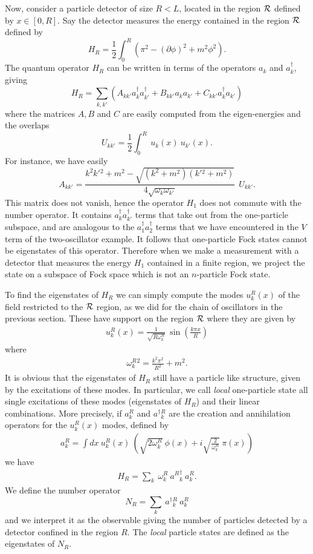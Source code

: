 \documentclass[10pt, nofootinbib]{revtex4}
\newcommand{\be}{\begin{equation}}
\newcommand{\ee}{\end{equation}}
\newcommand{\bea}{\begin{eqnarray}}
\newcommand{\eea}{\end{eqnarray}}
\begin{document}
Now, consider a particle detector of size $R<L$, located in the
region $\cal R$ defined by $x\in [0,R]$.  Say the detector measures
the energy contained in the region $\cal R$ defined by
%
\be 
H_{R} = \frac{1}{2} \int_{0}^{R}
\left(\pi^2-(\partial\phi)^2+m^2\phi^2 \right).  
\ee
%
The quantum operator $H_{R}$ can be written in terms of the 
operators $a_{k}$ and $a^\dagger_{k}$, giving 
%
\be 
H_{R} = \sum_{k,k'} (A_{kk'} a^\dagger_{k}a^\dagger_{k'}+
B_{kk'} a_{k}a_{k'}+
C_{kk'} a^\dagger_{k}a_{k'})
\ee
%
where the matrices $A, B$ and $C$ are easily computed from the 
eigen-energies and the overlaps
%
\be 
U_{kk'} =  \frac{1}{2} \int_{0}^{R} \ u_{k}(x)   \ u_{k'}(x).   
\ee
%
For instance, we have easily
%
\be 
A_{kk'} = \frac{k^2k'{}^2+m^2-\sqrt{(k^2+m^2)(k'{}^2+m^2)}}
{4\sqrt{\omega_{k}\omega_{k'}}}\ \  U_{kk'} .   
\ee
%
This matrix does not vanish, hence the operator $H_{1}$ does not
commute with the number operator.  It contains $
a^\dagger_{k}a^\dagger_{k'}$ terms that take out from the one-particle
subspace, and are analogous to the $ a^\dagger_{1}a^\dagger_{2}$
terms that we have encountered in the $V$ term of the two-oscillator
example.  It follows that one-particle Fock states cannot be
eigenstates of this operator.  Therefore when we make a measurement
with a detector that measures the energy $H_{1}$ contained in a finite
region, we project the state on a subspace of Fock space which is not
an $n$-particle Fock state.  

To find the eigenstates of $H_{R}$ we can simply compute the modes
$u^{R}_{k}(x)$ of the field restricted to the $\cal R$ region, as we
did for the chain of oscillators in the previous section.  These have
support on the region $\cal R$ where they are given by
%
\bea 
u^{R}_{k}(x)= \frac{1}{\sqrt{R \omega^{R}_{k}}} \  
\sin \left( \frac{k \pi x}{R}
\right)
\eea
%
where
%
\bea \omega^{R}_{k}{}^2 = \frac{k^2 \pi^2}{R^2} + m^2.  \eea
%
It is obvious that the eigenstates of $H_{R}$ still
have a particle like structure, given by the excitations of these
modes.  In particular, we call \emph{local} one-particle state all
single excitations of these modes (eigenstates of $H_{R}$) and their
linear combinations.  More precisely, if $a^{R}_{k}$ and
$a^\dagger{}^{R}_{k}$ are the creation and annihilation operators
for the  $u^{R}_{k}(x)$ modes, defined by 
%
\bea 
a^R_{k} = \int dx\ u^R_{k}(x) \ \left( \sqrt{2\omega^R_{k}}\ \phi(x)+i
\sqrt{\frac{2}{\omega^R_{k}}}\ \pi(x)\right)
\eea
%
we have 
%
\bea 
H_R =  \sum_{k}\ \omega^R_{k}\ a^R{}^\dagger_{k}\ a^R_{k}.
\eea
%
We define the number operator
%
\be 
N_{R}= \sum_{k} \ a^\dagger{}^{R}_{k}\  a^{R}_{k}
\ee
%
and we interpret it as the observable giving the number of particles
detected by a detector confined in the region $R$.  The \emph{local}
particle states are defined as the eigenstates of $N_{R}$. 
\end{document}
